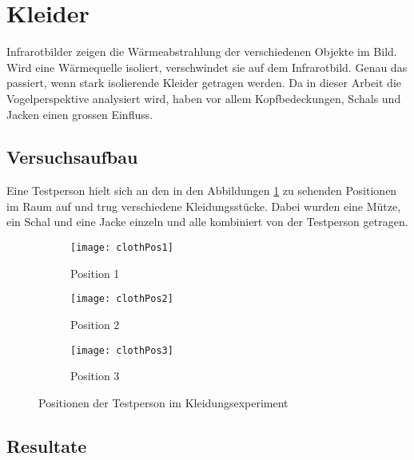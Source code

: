 \section{Kleider}
\label{sec:cloths}

Infrarotbilder zeigen die Wärmeabstrahlung der verschiedenen Objekte im Bild. Wird eine Wärmequelle isoliert, verschwindet sie auf dem Infrarotbild. Genau das passiert, wenn stark isolierende Kleider getragen werden. Da in dieser Arbeit die Vogelperspektive analysiert wird, haben vor allem Kopfbedeckungen, Schals und Jacken einen grossen Einfluss. 

\subsection{Versuchsaufbau}

Eine Testperson hielt sich an den in den Abbildungen \ref{fig:clothPositions} zu sehenden Positionen im Raum auf und trug verschiedene Kleidungsstücke. Dabei wurden eine Mütze, ein Schal und eine Jacke einzeln und alle kombiniert von der Testperson getragen.

\begin{figure}[H]
	\centering
	\begin{subfigure}{.45\linewidth}
		\centering
		\texttt{[image: clothPos1]}
		\caption{Position 1}
	\end{subfigure}
	\begin{subfigure}{.45\linewidth}
		\centering
		\texttt{[image: clothPos2]}
		\caption{Position 2}
	\end{subfigure}
	\begin{subfigure}{.45\linewidth}
		\centering
		\texttt{[image: clothPos3]}
		\caption{Position 3}
	\end{subfigure}
	\caption{Positionen der Testperson im Kleidungsexperiment}
	\label{fig:clothPositions}
\end{figure}

\subsection{Resultate}

